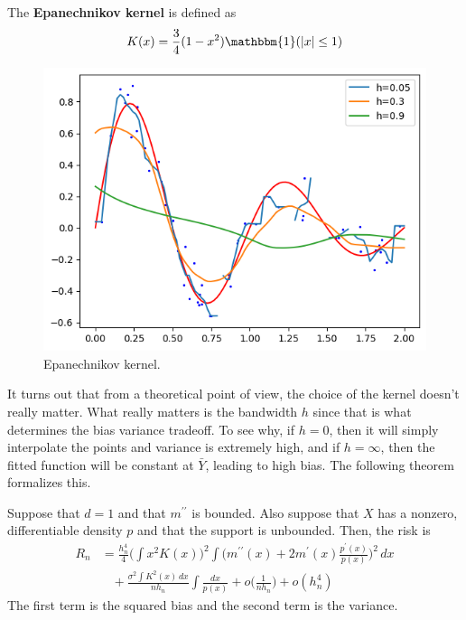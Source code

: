 \documentclass{article}
\begin{document}
    \begin{definition}
      The \textbf{Epanechnikov kernel} is defined as 
      \begin{equation}
        K(x) = \frac{3}{4} (1 - x^2) \mathbbm{1}(|x| \leq 1)
      \end{equation}
      \begin{figure}[H]
        \centering 
        \includegraphics[scale=0.6]{img/epanechnikov_smoother.png}
        \caption{Epanechnikov kernel.} 
        \label{fig:epanechnikov_smoother}
      \end{figure}
    \end{definition}

    It turns out that from a theoretical point of view, the choice of the kernel doesn't really matter. What really matters is the bandwidth $h$ since that is what determines the bias variance tradeoff. To see why, if $h = 0$, then it will simply interpolate the points and variance is extremely high, and if $h = \infty$, then the fitted function will be constant at $\bar{Y}$, leading to high bias. The following theorem formalizes this.  

    \begin{theorem}
      Suppose that $d = 1$ and that $m^{\prime\prime}$ is bounded. Also suppose that $X$ has a nonzero, differentiable density $p$ and that the support is unbounded. Then, the risk is 
      \begin{align}
        R_n & = \frac{h_n^4}{4} \bigg( \int x^2 K(x) \bigg)^2 \int \bigg( m^{\prime\prime} (x) + 2m^\prime (x) \frac{p^\prime (x)}{p(x)} \bigg)^2 \,dx \\
            & \;\;\; + \frac{\sigma^2 \int K^2(x)\,dx} {n h_n} \int \frac{dx}{p(x)} + o \bigg( \frac{1}{n h_n} \bigg) + o(h_n^4) 
      \end{align}
      The first term is the squared bias and the second term is the variance. 
    \end{theorem}
\end{document}
